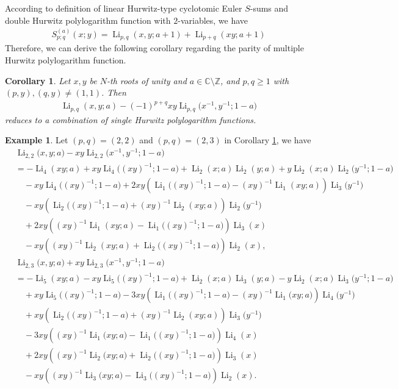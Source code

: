 \documentclass[11pt]{article}
\DeclareMathOperator{\Li}{Li}
\def\Z{\mathbb{Z}}
\theoremstyle{plain}
\newtheorem{cor}[thm]{Corollary}
\theoremstyle{definition}
\newtheorem{exa}[thm]{Example}
\begin{document}
According to definition of linear Hurwitz-type cyclotomic Euler $S$-sums and double Hurwitz polylogarithm function with $2$-variables, we have
\begin{align*}
	S_{p;q}^{(a)}(x;y)=\Li_{p,q}(x,y;a+1)+\Li_{p+q}(xy;a+1)
\end{align*}
Therefore, we can derive the following corollary regarding the parity of multiple Hurwitz polylogarithm function.
\begin{cor}\label{thm-linearCES-cor}Let $x,y$ be $N$-th roots of unity and $a\in \mathbb{C}\setminus \Z$, and $p,q\ge1$ with $(p,y),(q,y)\ne(1,1)$. Then
\begin{align}
\Li_{p,q}(x,y;a)-(-1)^{p+q}xy\Li_{p,q}\Big(x^{-1},y^{-1};1-a\Big)
\end{align}
reduces to a combination of single Hurwitz polylogarithm functions.
\end{cor}
\begin{exa}Let $(p,q)=(2,2)$ and $(p,q)=(2,3)$ in Corollary \ref{thm-linearCES-cor}, we have
	\begin{align*}
		&\Li_{2,2}\Big(x,y;a\Big)-xy\Li_{2,2}\Big(x^{-1},y^{-1};1-a\Big)\\
		&=-\Li_{4}(xy;a)+xy\Li_{4}\Big((xy)^{-1};1-a\Big)+\Li_{2}(x;a)\Li_2(y;a)+y\Li_2(x;a)\Li_2\Big(y^{-1};1-a\Big)\\
		&\quad-xy\Li_{4}\Big((xy)^{-1};1-a\Big)+2xy\left(\Li_{1}\Big((xy)^{-1};1-a\Big)-(xy)^{-1}\Li_{1}(xy;a)\right)\Li_{3}\Big(y^{-1}\Big)\\
		&\quad-xy\left(\Li_{2}\Big((xy)^{-1};1-a\Big)+(xy)^{-1}\Li_{2}(xy;a)\right)\Li_{2}\Big(y^{-1}\Big)\\
		&\quad+2xy\left((xy)^{-1}\Li_{1}(xy;a)-\Li_{1}\Big((xy)^{-1};1-a\Big)\right)\Li_{3}(x)\\
		&\quad-xy\left((xy)^{-1}\Li_{2}(xy;a)+\Li_{2}\Big((xy)^{-1};1-a\Big)\right)\Li_{2}(x),\\
		     &\Li_{2,3}\Big(x,y;a\Big)+xy\Li_{2,3}\Big(x^{-1},y^{-1};1-a\Big)\\
		&=-\Li_{5}(xy;a)-xy\Li_{5}\Big((xy)^{-1};1-a\Big)+\Li_{2}(x;a)\Li_3(y;a)-y\Li_2(x;a)\Li_3\Big(y^{-1};1-a\Big)\\
		&\quad+xy\Li_{5}\Big((xy)^{-1};1-a\Big)-3xy\left(\Li_{1}\Big((xy)^{-1};1-a\Big)-(xy)^{-1}\Li_{1}\Big(xy;a\Big)\right)\Li_{4}\Big(y^{-1}\Big)\\
		&\quad+xy\left(\Li_{2}\Big((xy)^{-1};1-a\Big)+(xy)^{-1}\Li_{2}(xy;a)\right)\Li_{3}\Big(y^{-1}\Big)\\
		&\quad-3xy\left((xy)^{-1}\Li_{1}\Big(xy;a\Big)-\Li_{1}\Big((xy)^{-1};1-a\Big)\right)\Li_{4}(x)\\
		&\quad+2xy\left((xy)^{-1}\Li_{2}\Big(xy;a\Big)+\Li_{2}\Big((xy)^{-1};1-a\Big)\right)\Li_{3}(x)\\
		&\quad-xy\left((xy)^{-1}\Li_{3}\Big(xy;a\Big)-\Li_{3}\Big((xy)^{-1};1-a\Big)\right)\Li_{2}(x).
	\end{align*}
\end{exa}
\end{document}
